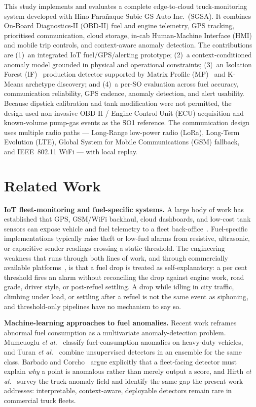 \documentclass[10pt,journal]{IEEEtran}
\begin{document}
This study implements and evaluates a complete edge-to-cloud truck-monitoring system developed with Hino Para\~naque Subic GS Auto Inc.~(SGSA). It combines On-Board Diagnostics-II (OBD-II) fuel and engine telemetry, GPS tracking, prioritised communication, cloud storage, in-cab Human-Machine Interface (HMI) and mobile trip controls, and context-aware anomaly detection. The contributions are (1)~an integrated IoT fuel/GPS/alerting prototype; (2)~a context-conditioned anomaly model grounded in physical and operational constraints; (3)~an Isolation Forest (IF)~\cite{liu2008isolation_forest} production detector supported by Matrix Profile (MP)~\cite{yeh2016matrix_profile} and K-Means archetype discovery; and (4)~a per-SO evaluation across fuel accuracy, communication reliability, GPS cadence, anomaly detection, and alert usability. Because dipstick calibration and tank modification were not permitted, the design used non-invasive OBD-II / Engine Control Unit (ECU) acquisition and known-volume pump-gas events as the SO1 reference. The communication design uses multiple radio paths --- Long-Range low-power radio (LoRa), Long-Term Evolution (LTE), Global System for Mobile Communications (GSM) fallback, and IEEE~802.11 WiFi --- with local replay.

\section{Related Work}
\textbf{IoT fleet-monitoring and fuel-specific systems.} A large body of work has established that GPS, GSM/WiFi backhaul, cloud dashboards, and low-cost tank sensors can expose vehicle and fuel telemetry to a fleet back-office~\cite{mathi2024development}. Fuel-specific implementations typically raise theft or low-fuel alarms from resistive, ultrasonic, or capacitive sender readings crossing a static threshold. The engineering weakness that runs through both lines of work, and through commercially available platforms~\cite{samsara2026fuel_management}, is that a fuel drop is treated as self-explanatory: a per cent threshold fires an alarm without reconciling the drop against engine work, road grade, driver style, or post-refuel settling. A drop while idling in city traffic, climbing under load, or settling after a refuel is not the same event as siphoning, and threshold-only pipelines have no mechanism to say so.

\textbf{Machine-learning approaches to fuel anomalies.} Recent work reframes abnormal fuel consumption as a multivariate anomaly-detection problem. Mumcuoglu \textit{et al.}~\cite{mumcuoglu2023fuel} classify fuel-consumption anomalies on heavy-duty vehicles, and Turan \textit{et al.}~\cite{turan2024detecting} combine unsupervised detectors in an ensemble for the same class. Barbado and Corcho~\cite{barbado2022interpretable} argue explicitly that a fleet-facing detector must explain \emph{why} a point is anomalous rather than merely output a score, and Hirth \textit{et al.}~\cite{hirth2025truck_survey} survey the truck-anomaly field and identify the same gap the present work addresses: interpretable, context-aware, deployable detectors remain rare in commercial truck fleets.
\end{document}
